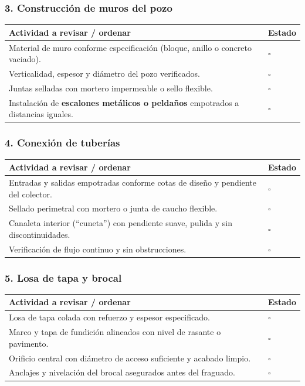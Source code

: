 \documentclass[12pt]{article}
\newcommand{\cbox}{\(\square\)}
\renewcommand{\cbox}{\(\square\)} %
\begin{document}
	\subsubsection*{3. Construcción de muros del pozo}
	\begin{tabularx}{\linewidth}{>{\raggedright\arraybackslash}p{0.93\linewidth} >{\centering\arraybackslash}m{0.07\linewidth}}
		\toprule
		\textbf{Actividad a revisar / ordenar} & \textbf{Estado}\\
		\midrule
		Material de muro conforme especificación (bloque, anillo o concreto vaciado). & \cbox \\
		Verticalidad, espesor y diámetro del pozo verificados. & \cbox \\
		Juntas selladas con mortero impermeable o sello flexible. & \cbox \\
		Instalación de \textbf{escalones metálicos o peldaños} empotrados a distancias iguales. & \cbox \\
		\bottomrule
	\end{tabularx}
	
	\subsubsection*{4. Conexión de tuberías}
	\begin{tabularx}{\linewidth}{>{\raggedright\arraybackslash}p{0.93\linewidth} >{\centering\arraybackslash}m{0.07\linewidth}}
		\toprule
		\textbf{Actividad a revisar / ordenar} & \textbf{Estado}\\
		\midrule
		Entradas y salidas empotradas conforme cotas de diseño y pendiente del colector. & \cbox \\
		Sellado perimetral con mortero o junta de caucho flexible. & \cbox \\
		Canaleta interior (“cuneta”) con pendiente suave, pulida y sin discontinuidades. & \cbox \\
		Verificación de flujo continuo y sin obstrucciones. & \cbox \\
		\bottomrule
	\end{tabularx}
	
	\subsubsection*{5. Losa de tapa y brocal}
	\begin{tabularx}{\linewidth}{>{\raggedright\arraybackslash}p{0.93\linewidth} >{\centering\arraybackslash}m{0.07\linewidth}}
		\toprule
		\textbf{Actividad a revisar / ordenar} & \textbf{Estado}\\
		\midrule
		Losa de tapa colada con refuerzo y espesor especificado. & \cbox \\
		Marco y tapa de fundición alineados con nivel de rasante o pavimento. & \cbox \\
		Orificio central con diámetro de acceso suficiente y acabado limpio. & \cbox \\
		Anclajes y nivelación del brocal asegurados antes del fraguado. & \cbox \\
		\bottomrule
	\end{tabularx}
	
\end{document}
